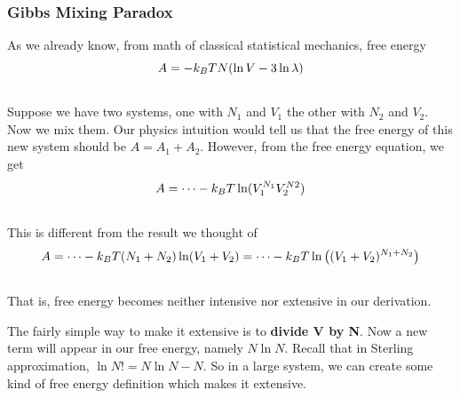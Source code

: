 \documentclass[letterpaper,10pt,english]{sphinxmanual}
\begin{document}
\subsubsection{Gibbs Mixing Paradox}
\label{equilibrium/week3:gibbs-mixing-paradox}
As we already know, from math of classical statistical mechanics, free energy
\begin{gather}
\begin{split}A  = -k_B T N ( \ln V - 3 \ln \lambda )\end{split}\notag\\\begin{split}\end{split}\notag
\end{gather}
Suppose we have two systems, one with $N_1$ and $V_1$ the other with $N_2$ and $V_2$. Now we mix them. Our physics intuition would tell us that the free energy of this new system should be $A = A_1 + A_2$. However, from the free energy equation, we get
\begin{gather}
\begin{split}A = \cdots - k_B T \ln (V_1^{N_1} V_2^{N2})\end{split}\notag\\\begin{split}\end{split}\notag
\end{gather}
This is different from the result we thought of
\begin{gather}
\begin{split}A = \cdots - k_B T (N_1 + N_2) \ln (V_1 + V_2) = \cdots - k_B T \ln \left(  (V_1 + V_2)^{N_1+N_2}  \right)\end{split}\notag\\\begin{split}\end{split}\notag
\end{gather}
That is, free energy becomes neither intensive nor extensive in our derivation.

The fairly simple way to make it extensive is to \textbf{divide V by N}. Now a new term will appear in our free energy, namely $N\ln N$. Recall that in Sterling approximation, $\ln N! = N\ln N -N$. So in a large system, we can create some kind of free energy definition which makes it extensive.
\end{document}
